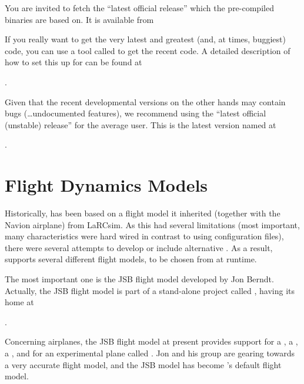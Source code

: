 You are invited to fetch the ``latest official release'' which the
pre-compiled binaries are based on.  It is available from
\medskip

\medskip

If you really want to get the very latest and greatest (and, at times,
buggiest) code, you can use a tool called 
to get the recent code. A detailed description of how to set this up for \FlightGear{}
can be found at
 \medskip

.
 \medskip

 \noindent
 Given that the recent developmental versions on the
 other hands may contain bugs (\ldots undocumented features), we recommend using the
 ``latest official (unstable) release'' for the average user. This is the latest version named at

 .

\section{Flight Dynamics Models\label{flightmodels}}
Historically, \FlightGear{} has been based on a flight model it inherited (together
with the Navion airplane) from LaRCsim. As this had several limitations (most important,
many characteristics were hard wired in contrast to using configuration files), there were
several attempts to develop or include alternative . As a result,
\FlightGear{} supports several different flight models, to be chosen from at runtime.

The most important one is the JSB flight model developed by Jon Berndt. Actually, the JSB
flight model is part of a stand-alone project called \JSBSim, having its home at
 \medskip

.
 \medskip

 \noindent
Concerning airplanes, the JSB flight model at present provides support for a
, a , a , and for an experimental plane
called . Jon and his group are gearing towards a very accurate flight model, and the
JSB model has become \FlightGear{}'s default flight model.


